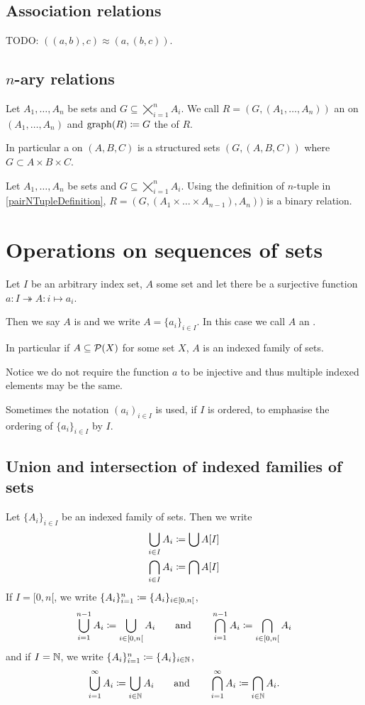 \subsection{Association relations}
TODO: $((a,b),c) \approx (a,(b,c))$.


\subsection{$n$-ary relations}
\begin{definition}
Let $A_1, \ldots, A_n$ be sets and $G \subseteq \bigtimes_{i=1}^nA_i$. We call $R = (G, (A_1, \ldots, A_n))$ an  on $(A_1, \ldots, A_n)$ and $\operatorname{graph}(R) \coloneqq G$ the  of $R$.
\end{definition}
In particular a  on $(A,B,C)$ is a structured sets $(G,(A,B,C))$ where $G \subset A\times B\times C$.

\begin{proposition}
Let $A_1, \ldots, A_n$ be sets and $G \subseteq \bigtimes_{i=1}^nA_i$. Using the definition of $n$-tuple in \ref{pairNTupleDefinition}, $R = (G, (A_1 \times \ldots \times A_{n-1}), A_n))$ is a binary relation.
\end{proposition}

\section{Operations on sequences of sets}
\begin{definition}
Let $I$ be an arbitrary index set, $A$ some set and let there be a surjective function $a: I\twoheadrightarrow A: i \mapsto a_i$.

Then we say $A$ is  and we write $A = \{a_i\}_{i\in I}$. In this case we call $A$ an .

In particular if $A\subseteq \operatorname{\mathcal{P}}(X)$ for some set $X$, $A$ is an indexed family of sets.
\end{definition}
Notice we do not require the function $a$ to be injective and thus multiple indexed elements may be the same.

Sometimes the notation $(a_i)_{i\in I}$ is used, if $I$ is ordered, to emphasise the ordering of $\{a_i\}_{i\in I}$ by $I$.

\subsection{Union and intersection of indexed families of sets}
Let $\{A_i\}_{i\in I}$ be an indexed family of sets. Then we write
\begin{align*}
\bigcup_{i\in I} A_i &\coloneqq \bigcup A[I] \\
\bigcap_{i\in I} A_i &\coloneqq \bigcap A[I]
\end{align*}
If $I = [0,n[$, we write $\{A_i\}_{i=1}^{n} \coloneqq \{A_i\}_{i\in [0,n[}$,
\[ \bigcup_{i=1}^{n-1} A_i \coloneqq \bigcup_{i\in [0,n[} A_i \qquad \text{and} \qquad \bigcap_{i=1}^{n-1} A_i \coloneqq \bigcap_{i\in [0,n[} A_i \]
and if $I=\mathbb{N}$, we write $\{A_i\}_{i=1}^{n} \coloneqq \{A_i\}_{i\in \mathbb{N}}$,
\[ \bigcup_{i=1}^{\infty} A_i \coloneqq \bigcup_{i\in \mathbb{N}} A_i \qquad \text{and} \qquad \bigcap_{i=1}^{\infty} A_i \coloneqq \bigcap_{i\in \mathbb{N}} A_i. \]

